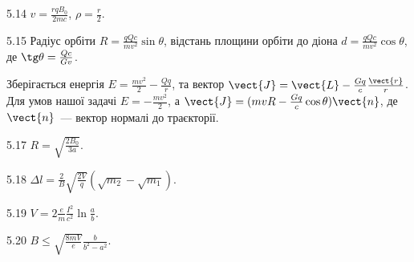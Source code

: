 \begin{Solution}{5.{14}}
	$v = \frac{rqB_0}{2mc}$, $\rho = \frac{r}{2}$.
\end{Solution}
\begin{Solution}{5.{15}}
	Радіус орбіти $R = \frac{qQc}{mv^2}\sin\theta$, відстань площини орбіти до діона $d = \frac{qQc}{mv^2}\cos\theta$, де $\tg\theta = \frac{Q c}{G v}$.

	Зберігається енергія $E = \frac{mv^2}{2} - \frac{Qq}{r}$, та вектор $\vect{J} = \vect{L} - \frac{Gq}{c}\frac{\vect{r}}{r} $. Для умов нашої задачі $E = -\frac{mv^2}{2}$, а $\vect{J} = (mvR - \frac{Gq}{c}\cos\theta) \vect{n} $, де $\vect{n}$~--- вектор нормалі до траєкторії.
\end{Solution}
\begin{Solution}{5.{17}}
	$R = \sqrt{\frac{2B_0}{3a}}.$
\end{Solution}
\begin{Solution}{5.{18}}
	$\Delta l = \frac{2}{B}\sqrt{\frac{2V}{q}} \left( \sqrt{m_2} - \sqrt{m_1} \right) $.
\end{Solution}
\begin{Solution}{5.{19}}
	$V = 2\frac{e}{m}\frac{I^2}{c^2}\ln\frac{a}{b}$.
\end{Solution}
\begin{Solution}{5.{20}}
	$B \le \sqrt{\frac{8mV}{e}} \frac{b}{b^2 - a^2}$.
\end{Solution}
